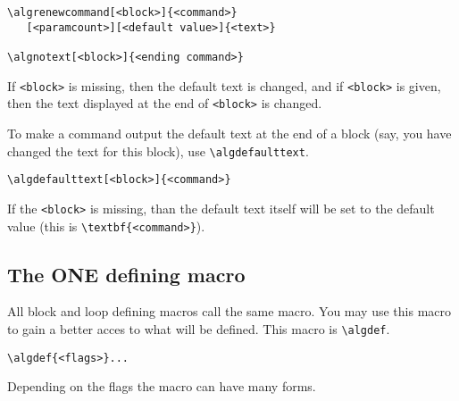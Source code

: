 \documentclass{article}
\begin{document}
\begin{minipage}[b]{0.5\linewidth}
\begin{minipage}[b]{0.5\linewidth}
\begin{minipage}[b]{0.5\linewidth}
\begin{minipage}[b]{0.5\linewidth}
\begin{minipage}[b]{0.5\linewidth}
\begin{minipage}[b]{0.5\linewidth}
\begin{minipage}[b]{0.5\linewidth}
\begin{verbatim}
\algrenewcommand[<block>]{<command>}
   [<paramcount>][<default value>]{<text>}

\algnotext[<block>]{<ending command>}
\end{verbatim}

If \verb:<block>: is missing, then the default text is changed, and if \verb:<block>: is given,
then the text displayed at the end of \verb:<block>: is changed.

To make a command output the default text at the end of a block (say, you have changed the text
for this block), use \verb:\algdefaulttext:.

\begin{verbatim}
\algdefaulttext[<block>]{<command>}
\end{verbatim}

If the \verb:<block>: is missing, than the default text itself will be set to the default value
(this is \verb:\textbf{<command>}:).



\subsection{The ONE defining macro}

All block and loop defining macros call the same macro. You may use this macro to gain a
better acces to what will be defined. This macro is \verb:\algdef:.

\begin{verbatim}
\algdef{<flags>}...
\end{verbatim}

Depending on the flags the macro can have many forms.


\end{minipage}
\end{minipage}
\end{minipage}
\end{minipage}
\end{minipage}
\end{minipage}
\end{minipage}
\end{document}
